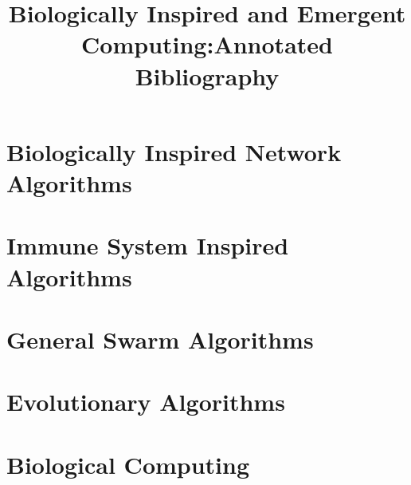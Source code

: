 

\bibliographyunit[\section]

\title{Biologically Inspired and Emergent Computing:Annotated Bibliography} 

\author{
}

\maketitle
\section{Biologically Inspired Network Algorithms}
\nocite{1543949}
\nocite{508968}
\nocite{1322308}
\nocite{1315848}
\nocite{1555287}
\nocite{1555288}
\nocite{1555289}
\putbib
\section{Immune System Inspired Algorithms}
\nocite{00538159}
\nocite{00970460}
\nocite{1018906}
\putbib
\section{General Swarm Algorithms}
\nocite{rouff-2004}
\nocite{1089771}
\putbib
\section{Evolutionary Algorithms}
\nocite{1555286}
\putbibt
\section{Biological Computing}
\nocite{1555300}
\putbib
